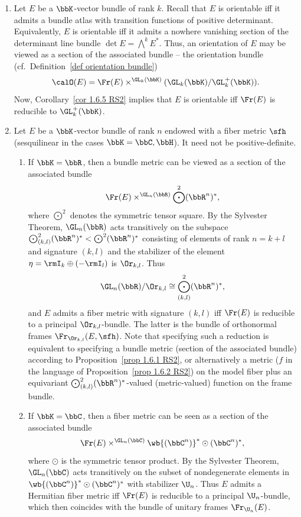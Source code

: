 \begin{example}[{{\cite[Ex.~1.6.6]{RS2}}}]\label{ex 1.6.6 RS2}
    \begin{enumerate}
        \item Let $E$ be a $\bbK$-vector bundle of rank $k$. Recall that $E$ is orientable iff it admits a bundle atlas with transition functions of positive determinant. Equivalently, $E$ is orientable iff it admits a nowhere vanishing section of the determinant line bundle $\det E=\bigwedge^k E^\ast$. Thus, an orientation of $E$ may be viewed as a section of the associated bundle -- the orientation bundle (cf.\ Definition~\ref{def orientation bundle})
        \[\calO(E)=\Fr(E)\times^{\GL_k(\bbK)}(\GL_k(\bbK)\slash \GL^+_k(\bbK)).\]
        Now, Corollary~\ref{cor 1.6.5 RS2} implies that $E$ is orientable iff $\Fr(E)$ is reducible to $\GL_k^+(\bbK)$.

        \item Let $E$ be a $\bbK$-vector bundle of rank $n$ endowed with a fiber metric $\sfh$ (sesquilinear in the cases $\bbK=\bbC,\bbH$). It need not be positive-definite.
        \begin{enumerate}
            \item If $\bbK=\bbR$, then a bundle metric can be viewed as a section of the associated bundle
            \[\Fr(E)\times^{\GL_n(\bbR)} \bigodot^2(\bbR^n)^\ast,\]
            where $\bigodot^2$ denotes the symmetric tensor square. By the Sylvester Theorem, $\GL_n(\bbR)$ acts transitively on the subspace $\bigodot^2_{(k,l)}(\bbR^n)^\ast< \bigodot^2(\bbR^n)^\ast$ consisting of elements of rank $n=k+l$ and signature $(k,l)$ and the stabilizer of the element $\eta=\rmI_k\oplus (-\rmI_l)$ is $\Or_{k,l}$. Thus
            \[\GL_n(\bbR)\slash \Or_{k,l}\cong \bigodot^2_{(k,l)}(\bbR^n)^\ast,\]
            and $E$ admits a fiber metric with signature $(k,l)$ iff $\Fr(E)$ is reducible to a principal $\Or_{k,l}$-bundle. The latter is the bundle of orthonormal frames $\Fr_{\Or_{k,l}}(E,\sfh)$. Note that specifying such a reduction is equivalent to specifying a bundle metric (section of the associated bundle) according to Proposition~\ref{prop 1.6.1 RS2}, or alternatively a metric ($f$ in the language of Proposition~\ref{prop 1.6.2 RS2}) on the model fiber plus an equivariant $\bigodot^2_{(k,l)}(\bbR^n)^\ast$-valued (metric-valued) function on the frame bundle.

            \item If $\bbK=\bbC$, then a fiber metric can be seen as a section of the associated bundle
            \[\Fr(E)\times^{\GL_n(\bbC)} \wb{{(\bbC^n)}}^\ast\odot (\bbC^n)^\ast,\]
            where $\odot$ is the symmetric tensor product. By the Sylvester Theorem, $\GL_n(\bbC)$ acts transitively on the subset of nondegenerate elements in $\wb{{(\bbC^n)}}^\ast\odot(\bbC^n)^\ast$ with stabilizer $\U_n$. Thus $E$ admits a Hermitian fiber metric iff $\Fr(E)$ is reducible to a principal $\U_n$-bundle, which then coincides with the bundle of unitary frames $\Fr_{\U_n}(E)$.
        \end{enumerate}
    \end{enumerate}
\end{example}

